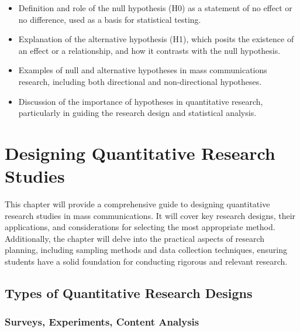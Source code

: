 \documentclass[
]{book}
\begin{document}
\begin{itemize}
\item
  Definition and role of the null hypothesis (H0) as a statement of no effect or no difference, used as a basis for statistical testing.
\item
  Explanation of the alternative hypothesis (H1), which posits the existence of an effect or a relationship, and how it contrasts with the null hypothesis.
\item
  Examples of null and alternative hypotheses in mass communications research, including both directional and non-directional hypotheses.
\item
  Discussion of the importance of hypotheses in quantitative research, particularly in guiding the research design and statistical analysis.
\end{itemize}

\hypertarget{designing-quantitative-research-studies}{%
\chapter*{Designing Quantitative Research Studies}\label{designing-quantitative-research-studies}}

This chapter will provide a comprehensive guide to designing quantitative research studies in mass communications. It will cover key research designs, their applications, and considerations for selecting the most appropriate method. Additionally, the chapter will delve into the practical aspects of research planning, including sampling methods and data collection techniques, ensuring students have a solid foundation for conducting rigorous and relevant research.

\hypertarget{types-of-quantitative-research-designs}{%
\section*{Types of Quantitative Research Designs}\label{types-of-quantitative-research-designs}}

\hypertarget{surveys-experiments-content-analysis}{%
\subsection*{Surveys, Experiments, Content Analysis}\label{surveys-experiments-content-analysis}}
\end{document}

